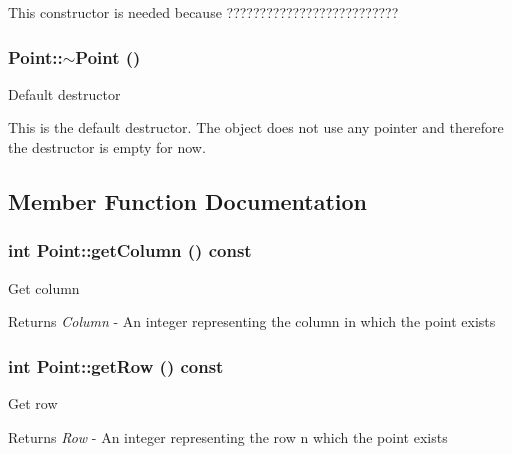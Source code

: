 This constructor is needed because ?????????????????????????? \hypertarget{classPoint_a395fa04b4ec126b66fc053f829a30cc1}{
\subsubsection[{$\sim$Point}]{\setlength{\rightskip}{0pt plus 5cm}Point::$\sim$Point ()}}
\label{classPoint_a395fa04b4ec126b66fc053f829a30cc1}
Default destructor

This is the default destructor. The object does not use any pointer and therefore the destructor is empty for now. 

\subsection{Member Function Documentation}
\hypertarget{classPoint_af4d25ed7e4898749cea5d2994cafd591}{
\subsubsection[{getColumn}]{\setlength{\rightskip}{0pt plus 5cm}int Point::getColumn () const}}
\label{classPoint_af4d25ed7e4898749cea5d2994cafd591}
Get column

\begin{DoxyReturn}{Returns}
{\itshape Column\/} -\/ An integer representing the column in which the point exists 
\end{DoxyReturn}
\hypertarget{classPoint_ab2c528e3bee2178c26fdce92786cd8f1}{
\subsubsection[{getRow}]{\setlength{\rightskip}{0pt plus 5cm}int Point::getRow () const}}
\label{classPoint_ab2c528e3bee2178c26fdce92786cd8f1}
Get row

\begin{DoxyReturn}{Returns}
{\itshape Row\/} -\/ An integer representing the row n which the point exists 
\end{DoxyReturn}


